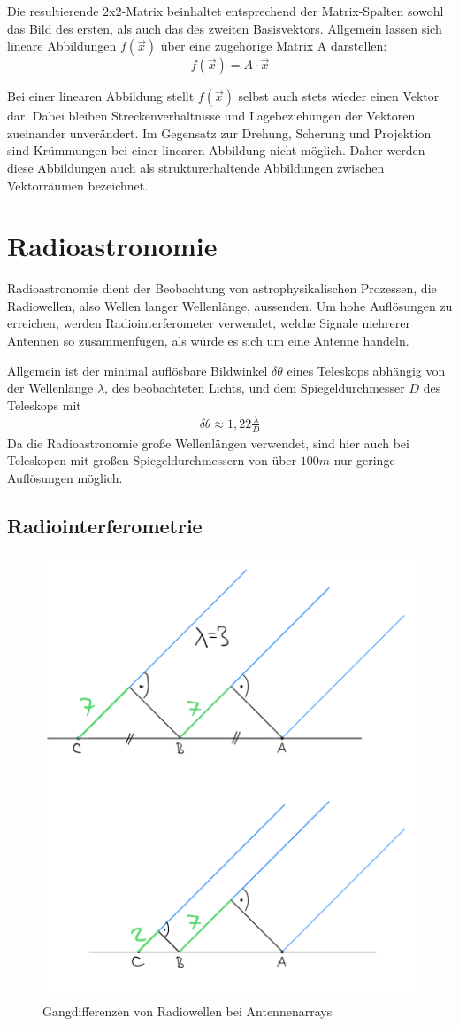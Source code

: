 \documentclass[]{dsadokumentation}
\begin{document}
Die resultierende $2$x$2$-Matrix beinhaltet entsprechend der Matrix-Spalten sowohl das Bild des ersten, als auch das des zweiten Basisvektors. Allgemein lassen sich lineare Abbildungen $f(\vec{x})$ über eine zugehörige Matrix A darstellen:
\[ f(\vec{x}) = A \cdot \vec{x} \]

Bei einer linearen Abbildung stellt $f(\vec{x})$ selbst auch stets wieder einen Vektor dar. Dabei bleiben Streckenverhältnisse und Lagebeziehungen der Vektoren zueinander unverändert. Im Gegensatz zur Drehung, Scherung und Projektion sind Krümmungen bei einer linearen Abbildung nicht möglich. Daher werden diese Abbildungen auch als strukturerhaltende Abbildungen zwischen Vektorräumen bezeichnet.

\section{Radioastronomie}

Radioastronomie dient der Beobachtung von astrophysikalischen Prozessen, die Radiowellen, also Wellen langer Wellenlänge, aussenden. Um hohe Auflösungen zu erreichen, werden Radiointerferometer verwendet, welche Signale mehrerer Antennen so zusammenfügen, als würde es sich um eine Antenne handeln.

Allgemein ist der minimal auflösbare Bildwinkel $\delta\theta$ eines Teleskops abhängig von der Wellenlänge $\lambda$, des beobachteten Lichts, und dem Spiegeldurchmesser $D$ des Teleskops mit \begin{eqnarray}
\delta\theta\approx1,22\frac{\lambda}{D}
\end{eqnarray}
Da die Radioastronomie große Wellenlängen verwendet, sind hier auch bei Teleskopen mit großen Spiegeldurchmessern von über $100m$ nur geringe Auflösungen möglich.

\subsection{Radiointerferometrie}
\begin{figure}[htb]
\centering
\includegraphics[width=.4\textwidth]{k4.2/baselineunterschied.png}
\caption{Gangdifferenzen von Radiowellen bei Antennenarrays}
\label{bild-baselineunterschied}
\end{figure}
\end{document}
